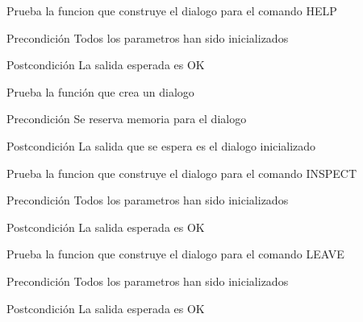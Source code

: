 \begin{DoxyRefList}
\item[\label{test__test000048}%
\hypertarget{test__test000048}{}%
Global \hyperlink{dialogue__test_8c_adb02112356fe68f0c26fa0a109f2e816}{test1\-\_\-dialogue\-\_\-help} ()]Prueba la funcion que construye el dialogo para el comando H\-E\-L\-P \begin{DoxyPrecond}{Precondición}
Todos los parametros han sido inicializados 
\end{DoxyPrecond}
\begin{DoxyPostcond}{Postcondición}
La salida esperada es O\-K  
\end{DoxyPostcond}

\item[\label{test__test000021}%
\hypertarget{test__test000021}{}%
Global \hyperlink{dialogue__test_8c_a7642ae995795f60126cc3d810f1e75e0}{test1\-\_\-dialogue\-\_\-ini} ()]Prueba la función que crea un dialogo \begin{DoxyPrecond}{Precondición}
Se reserva memoria para el dialogo 
\end{DoxyPrecond}
\begin{DoxyPostcond}{Postcondición}
La salida que se espera es el dialogo inicializado  
\end{DoxyPostcond}

\item[\label{test__test000040}%
\hypertarget{test__test000040}{}%
Global \hyperlink{dialogue__test_8c_a660d6c4e6da51800826f9af6dbd6ebee}{test1\-\_\-dialogue\-\_\-inspect} ()]Prueba la funcion que construye el dialogo para el comando I\-N\-S\-P\-E\-C\-T \begin{DoxyPrecond}{Precondición}
Todos los parametros han sido inicializados 
\end{DoxyPrecond}
\begin{DoxyPostcond}{Postcondición}
La salida esperada es O\-K  
\end{DoxyPostcond}

\item[\label{test__test000032}%
\hypertarget{test__test000032}{}%
Global \hyperlink{dialogue__test_8c_aaae4dc7b1bcabfc4e6ee958696f6ee49}{test1\-\_\-dialogue\-\_\-leave} ()]Prueba la funcion que construye el dialogo para el comando L\-E\-A\-V\-E \begin{DoxyPrecond}{Precondición}
Todos los parametros han sido inicializados 
\end{DoxyPrecond}
\begin{DoxyPostcond}{Postcondición}
La salida esperada es O\-K  
\end{DoxyPostcond}


\end{DoxyRefList}
